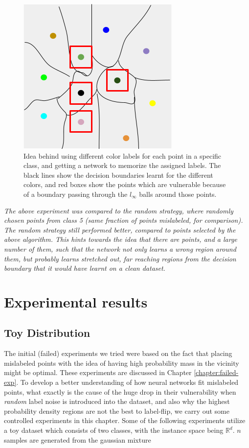 \documentclass{ociamthesis}
\begin{document}
\begin{figure}
    \centering
    \includegraphics[scale=0.4, trim={0 0 0 0}, clip]{thesis-coloring-trick.png}
    \caption{Idea behind using different color labels for each point in a specific class, and getting a network to memorize the assigned labels. The black lines show the decision boundaries learnt for the different colors, and red boxes show the points which are vulnerable because of a boundary passing through the $l_\infty$ balls around those points.}
\end{figure}

\emph{The above experiment was compared to the random strategy, where randomly chosen points from class 5 (same fraction of points mislabeled, for comparison). The random strategy still performed better, compared to points selected by the above algorithm. This hints towards the idea that there are points, and a large number of them, such that the network not only learns a wrong region around them, but probably learns stretched out, far reaching regions from the decision boundary that it would have learnt on a clean dataset.}



\chapter{Experimental results}
\label{chapter:experiments}

\section{Toy Distribution}

The initial (failed) experiments we tried were based on the fact that placing
mislabeled points with the idea of having high probability mass in the vicinity
might be optimal. These experiments are discussed in Chapter
\ref{chapter:failed-exp}. To develop a better understanding of how neural
networks fit mislabeled points, what exactly is the cause of the huge drop in
their vulnerability when \emph{random} label noise is introduced into the
dataset, and also why the highest probability density regions are not the best
to label-flip, we carry out some controlled experiments in this chapter. Some of
the following experiments utilize a toy dataset which consists of two classes,
with the instance space being $\mathbb{R}^d$. $n$ samples are generated from the
gaussian mixture
\end{document}
